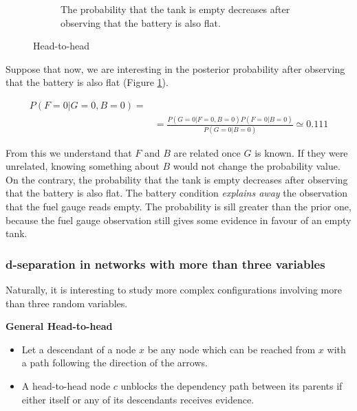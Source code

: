 \begin{figure}[H]
\begin{subfigure}
{			images/08_BayesianNetworks_fuelExample3.png
		}
		\caption{The probability that the tank is empty decreases after observing
		that the battery is also flat.}
		\label{fig:fuelExampleSelectedPart2}
	\end{subfigure}

	\caption{Head-to-head}
	\label{fig:head-to-head-example}
\end{figure}

Suppose that now, we are interesting in the posterior probability after observing
that the battery is also flat (Figure \ref{fig:fuelExampleSelectedPart2}).

\begin{align*}
	P(F=0 | G=0, B=0) = \\
	                   & =\frac{P(G=0|F=0,B=0)P(F=0|B=0)}{P(G=0|B=0)}\simeq 0.111
\end{align*}

From this we understand that $F$ and $B$ are related once $G$ is known. If they were
unrelated, knowing something about $B$ would not change the probability value. On
the contrary, the probability that the tank is empty decreases after observing
that the battery is also flat. The battery condition \textit{explains away} the
observation that the fuel gauge reads empty. The probability is sill greater than
the prior one, because the fuel gauge observation still gives some evidence in
favour of an empty tank.

\subsubsection{d-separation in networks with more than three variables}
Naturally, it is interesting to study more complex configurations involving more
than three random variables.
\newline

\textbf{General Head-to-head}
\begin{itemize}
	\item Let a descendant of a node $x$ be any node which can be reached from $x$
		with a path following the direction of the arrows.

	\item A head-to-head node $c$ unblocks the dependency path between its parents
		if either itself or any of its descendants receives evidence.
\end{itemize}

